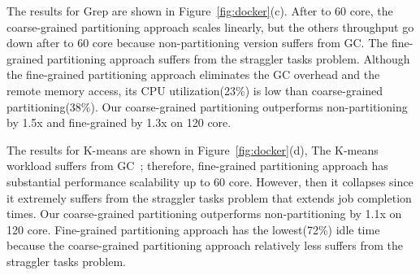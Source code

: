 The results for Grep are shown in Figure~\ref{fig:docker}(c).
After to 60 core, the coarse-grained partitioning approach scales linearly, but
the others throughput go down after to 60 core because non-partitioning
version suffers from GC.
The fine-grained partitioning approach suffers from the straggler tasks problem.
Although the fine-grained partitioning approach eliminates the GC overhead and
the remote memory access, its CPU utilization(23\%) is low than coarse-grained partitioning(38\%).
Our coarse-grained partitioning outperforms non-partitioning by 1.5x and fine-grained
by 1.3x on 120 core.

The results for K-means are shown in Figure~\ref{fig:docker}(d),
The K-means workload suffers from GC~\cite{Ahsan2016SVS}; therefore,
fine-grained partitioning approach has substantial performance scalability up to 60 core.
However, then it collapses since it extremely suffers from the
straggler tasks problem that extends job completion times.
Our coarse-grained partitioning outperforms non-partitioning by 1.1x on 120 core.
Fine-grained partitioning approach has the lowest(72\%) idle time because the coarse-grained 
partitioning approach relatively less suffers from the straggler tasks problem.

